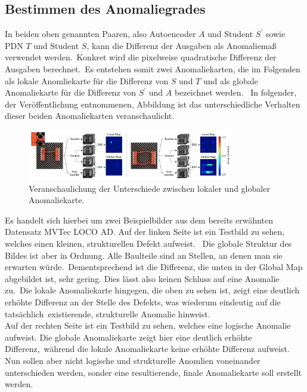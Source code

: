 \subsection{Bestimmen des Anomaliegrades}\label{subsec:efficientadbestimmenanomaliegrades}
In beiden oben genannten Paaren, also Autoencoder $A$ und Student $S^{\prime}$ sowie PDN $T$ und Student $S$, kann die Differenz der Ausgaben als Anomaliemaß verwendet werden.\
Konkret wird die pixelweise quadratische Differenz der Ausgaben berechnet.\
Es entstehen somit zwei Anomaliekarten, die im Folgenden als lokale Anomliekarte für die Differenz von $S$ und $T$ und als globale Anomaliekarte für die Differenz von $S^{\prime}$ und $A$ bezeichnet werden. \
In folgender, der Veröffentlichung entnommenen, Abbildung ist das unterschiedliche Verhalten dieser beiden Anomaliekarten veranschaulicht.\\
\begin{figure}[h]
    \centering
    \includegraphics[width=0.8\textwidth]{bilder/localglobal.png}
    \caption{Veranschaulichung der Unterschiede zwischen lokaler und globaler Anomaliekarte. \cite{efficientad}}
    \label{fig:localglobal}
\end{figure}
Es handelt sich hierbei um zwei Beispielbilder aus dem bereits erwähnten Datensatz MVTec LOCO AD. Auf der linken Seite ist ein Testbild zu sehen, welches einen kleinen, strukturellen Defekt aufweist. \
Die globale Struktur des Bildes ist aber in Ordnung. Alle Baulteile sind an Stellen, an denen man sie erwarten würde.\
Dementsprechend ist die Differenz, die unten in der \glqq Global Map\grqq{} abgebildet ist, sehr gering. Dies lässt also keinen Schluss auf eine Anomalie zu.\
Die lokale Anomaliekarte hingegen, die oben zu sehen ist, zeigt eine deutlich erhöhte Differenz an der Stelle des Defekts, was wiederum eindeutig auf die tatsächlich\
existierende, strukturelle Anomalie hinweist.\\
Auf der rechten Seite ist ein Testbild zu sehen, welches eine logische Anomalie aufweist. Die globale Anomaliekarte zeigt hier eine deutlich erhöhte Differenz,\
während die lokale Anomaliekarte keine erhöhte Differenz aufweist.\\
Nun sollen aber nicht logische und strukturelle Anomlien voneinander unterschieden werden, sonder eine resultierende, finale Anomaliekarte soll erstellt werden.\
